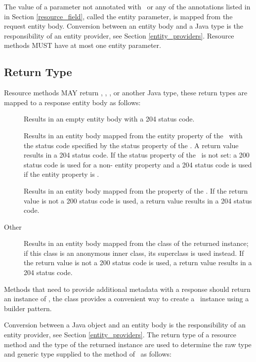 The value of a parameter not annotated with \FormParam\ or any of the annotations listed in in Section \ref{resource_field}, called the entity parameter, is mapped from the request entity body. Conversion between an entity body and a Java type is the responsibility of an entity provider, see Section \ref{entity_providers}. Resource methods MUST have at most one entity parameter.

\subsection{Return Type}
\label{resource_method_return}

Resource methods MAY return , \Response, , or another Java type, these return types are mapped to a response entity body as follows:

\begin{description}
\item[] Results in an empty entity body with a 204 status code.
\item[\Response] Results in an entity body mapped from the entity property of the \Response\ with the status code specified by the status property of the \Response. A  return value results in a 204 status code. If the status property of the \Response\ is not set: a 200 status code is used for a non- entity property and a 204 status code is used if the entity property is .
\item[] Results in an entity body mapped from the  property of the . If the return value is not  a 200 status code is used, a  return value results in a 204 status code.
\item[Other] Results in an entity body mapped from the class of the returned instance; if this class is an anonymous inner class, its superclass is used instead. If the return value is not  a 200 status code is used, a  return value results in a 204 status code.
\end{description}

Methods that need to provide additional metadata with a response should return an instance of \Response, the \Response{} class provides a convenient way to create a \Response\ instance using a builder pattern.

Conversion between a Java object and an entity body is the responsibility of an entity provider, see Section \ref{entity_providers}. The return type of a resource method and the type of the returned instance are used to determine the raw type and generic type supplied to the  method of \MsgWrite\ as follows:

